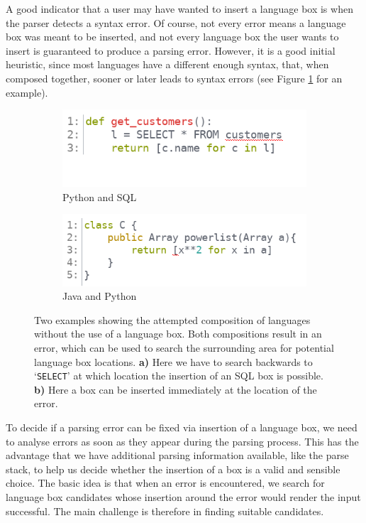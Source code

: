 \documentclass[sigplan,screen]{acmart}\settopmatter{printfolios=true,printccs=false,printacmref=false}
\begin{document}
A good indicator that a user may have wanted to insert a language box is when
the parser detects a syntax error. Of course, not every error means a
language box was meant to be inserted, and not every language box the user
wants to insert is guaranteed to produce a parsing error. However, it is a good
initial heuristic, since most languages have a different enough syntax, that, when
composed together, sooner or later leads to
syntax errors (see Figure \ref{fig_heuristic_example}
for an example).

\begin{figure}
    \begin{subfigure}{0.4\textwidth}
    \includegraphics[width=1\textwidth]{images/heuristic1.png}
    \caption{Python and SQL}
  \end{subfigure}
  \begin{subfigure}{0.4\textwidth}
    \includegraphics[width=1\textwidth]{images/heuristic2.png}
    \caption{Java and Python}
  \end{subfigure}
\caption{Two examples showing the attempted composition of languages without the
use of a language box. Both compositions result in an error, which can be used
to search the surrounding area for potential language box locations. \textbf{a)}
Here we have to search backwards to `\texttt{SELECT}' at which location the
insertion of an SQL box is possible. \textbf{b)} Here a box can be inserted
immediately at the location of the error.}
\label{fig_heuristic_example}
\end{figure}

To decide if a parsing error can be fixed via insertion of a language box, we
need to analyse errors as soon as they appear during the parsing process. This
has the advantage that we have additional parsing information available, like
the parse stack, to help us decide whether the insertion of a box is a valid
and sensible choice. The basic idea is
that when an error is encountered, we search for language box candidates whose
insertion around the error would render the input successful. The main
challenge is therefore in finding suitable candidates.
\end{document}
